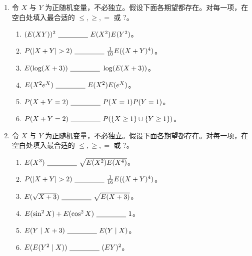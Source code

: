 \documentclass[UTF8, 12pt, fontset=fandol, oneside]{ctexart}
\begin{document}
\begin{enumerate}
  \item 令 $X$ 与 $Y$ 为正随机变量，不必独立。假设下面各期望都存在。对每一项，在空白处填入最合适的 $\le,\ge,=$ 或 $?$。
  \begin{enumerate}
    \item $(E(XY))^2\ \underline{\hspace{1.5cm}}\ E(X^2)E(Y^2)$。
    \item $P(|X+Y|>2)\ \underline{\hspace{1.5cm}}\ \frac1{10}E((X+Y)^4)$。
    \item $E(\log(X+3))\ \underline{\hspace{1.5cm}}\ \log(E(X+3))$。
    \item $E(X^2e^X)\ \underline{\hspace{1.5cm}}\ E(X^2)E(e^X)$。
    \item $P(X+Y=2)\ \underline{\hspace{1.5cm}}\ P(X=1)P(Y=1)$。
    \item $P(X+Y=2)\ \underline{\hspace{1.5cm}}\ P(\{X\ge 1\}\cup\{Y\ge 1\})$。
  \end{enumerate}

  \item 令 $X$ 与 $Y$ 为正随机变量，不必独立。假设下面各期望都存在。对每一项，在空白处填入最合适的 $\le,\ge,=$ 或 $?$。
  \begin{enumerate}
    \item $E(X^3)\ \underline{\hspace{1.5cm}}\ \sqrt{E(X^2)E(X^4)}$。
    \item $P(|X+Y|>2)\ \underline{\hspace{1.5cm}}\ \frac1{16}E((X+Y)^4)$。
    \item $E(\sqrt{X+3})\ \underline{\hspace{1.5cm}}\ \sqrt{E(X+3)}$。
    \item $E(\sin^2 X)+E(\cos^2 X)\ \underline{\hspace{1.5cm}}\ 1$。
    \item $E(Y\mid X+3)\ \underline{\hspace{1.5cm}}\ E(Y\mid X)$。
    \item $E(E(Y^2\mid X))\ \underline{\hspace{1.5cm}}\ (EY)^2$。
  \end{enumerate}


\end{enumerate}
\end{document}
